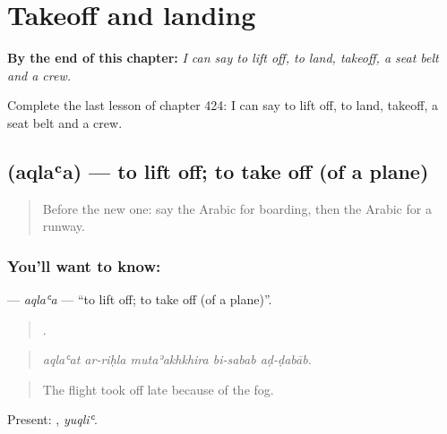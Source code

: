 
\chapter{Takeoff and landing}
\label{ch:ar-takeoff-and-landing}

\begin{chapteropening}
\textbf{By the end of this chapter:} \emph{I can say to lift off, to land, takeoff, a seat belt and a crew.}

Complete the last lesson of chapter 424: I can say to lift off, to land, takeoff, a seat belt and a crew.
\end{chapteropening}

\section[\texorpdfstring{\ar{أقلع} (aqlaʿa)}{أقلع (aqlaʿa)}]{ (aqlaʿa) — to lift off; to take off (of a plane)}

\label{lesson:AR-C424-aqlaa}



\begin{quote}
Before the new one: say the Arabic for boarding, then the Arabic for a runway.
\end{quote}

\subsection*{You'll want to know: }
\textbf{} — \emph{aqlaʿa} — \textquotedblleft{}to lift off; to take off (of a plane)\textquotedblright{}.

\begin{quote}
    .
\end{quote}

\begin{quote}
\emph{aqlaʿat ar-riḥla mutaʾakhkhira bi-sabab aḍ-ḍabāb.}
\end{quote}

\begin{quote}
The flight took off late because of the fog.
\end{quote}

Present: , \emph{yuqliʿ}.

